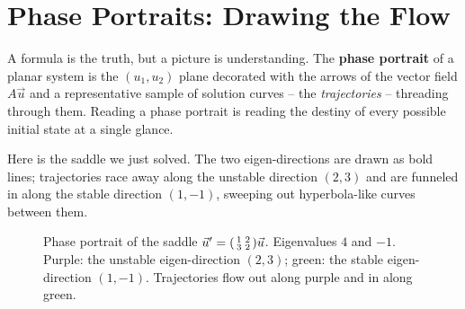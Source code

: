 \section{Phase Portraits: Drawing the Flow}
\label{ch39:phase}

A formula is the truth, but a picture is understanding. The \textbf{phase
portrait} of a planar system is the $(u_1, u_2)$ plane decorated with the
arrows of the vector field $A\vec u$ and a representative sample of solution
curves -- the \emph{trajectories} -- threading through them. Reading a phase
portrait is reading the destiny of every possible initial state at a single
glance.

Here is the saddle we just solved. The two eigen-directions are drawn as bold
lines; trajectories race away along the unstable direction $(2,3)$ and are
funneled in along the stable direction $(1,-1)$, sweeping out hyperbola-like
curves between them.

\begin{figure}[H]
\centering
{}
\caption{Phase portrait of the saddle $\vec u' = \protect\begin{psmallmatrix} 1 &
2 \\ 3 & 2\protect\end{psmallmatrix}\vec u$. Eigenvalues $4$ and $-1$. Purple: the
unstable eigen-direction $(2,3)$; green: the stable eigen-direction $(1,-1)$.
Trajectories flow out along purple and in along green.}
\label{ch39:fig-saddle}
\end{figure}

